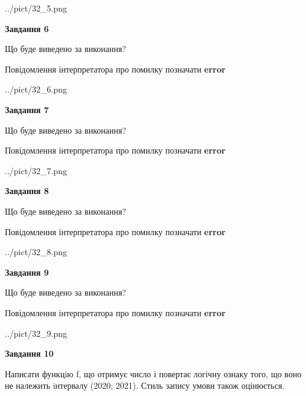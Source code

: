 \documentclass[12pt, ukrainian]{article}
\begin{document}
{\begin {large}
\begin{center}
	{../pict/32_5.png}
\end{center}
\newpage

{\begin {center}\textbf{Завдання 6}\end {center}}\par
Що буде виведено за виконання? \par
Повідомлення інтерпретатора про помилку позначати \textbf{error}

\begin{center}
	{../pict/32_6.png}
\end{center}
\newpage

{\begin {center}\textbf{Завдання 7}\end {center}}\par
Що буде виведено за виконання? \par
Повідомлення інтерпретатора про помилку позначати \textbf{error}

\begin{center}
	{../pict/32_7.png}
\end{center}
\newpage

{\begin {center}\textbf{Завдання 8}\end {center}}\par
Що буде виведено за виконання? \par
Повідомлення інтерпретатора про помилку позначати \textbf{error}

\begin{center}
	{../pict/32_8.png}
\end{center}
\newpage

{\begin {center}\textbf{Завдання 9}\end {center}}\par
Що буде виведено за виконання? \par
Повідомлення інтерпретатора про помилку позначати \textbf{error}

\begin{center}
	{../pict/32_9.png}
\end{center}
\newpage

{\begin {center}\textbf{Завдання 10}\end {center}}\par

Написати функцiю f, що отримує число і повертає логічну ознаку того, що воно не належить iнтервалу (2020; 2021). Стиль запису умови також оцінюється.\par
\newpage

\end {large}}
\end{document}
